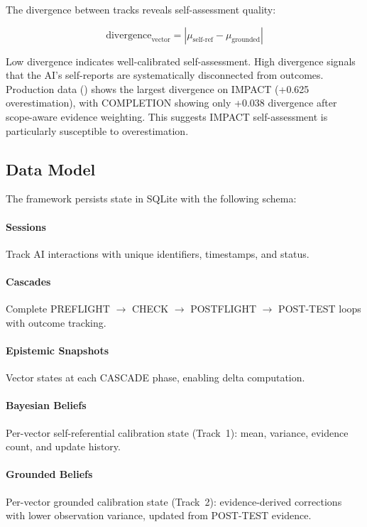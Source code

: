 The divergence between tracks reveals self-assessment quality:

\begin{equation}
\text{divergence}_{\text{vector}} = |\mu_{\text{self-ref}} - \mu_{\text{grounded}}|
\end{equation}

Low divergence indicates well-calibrated self-assessment. High divergence signals that the AI's self-reports are systematically disconnected from outcomes. Production data () shows the largest divergence on IMPACT (+0.625 overestimation), with COMPLETION showing only +0.038 divergence after scope-aware evidence weighting. This suggests IMPACT self-assessment is particularly susceptible to overestimation.

\subsection{Data Model}

The framework persists state in SQLite with the following schema:

\paragraph{Sessions} Track AI interactions with unique identifiers, timestamps, and status.

\paragraph{Cascades} Complete PREFLIGHT $\rightarrow$ CHECK $\rightarrow$ POSTFLIGHT $\rightarrow$ POST-TEST loops with outcome tracking.

\paragraph{Epistemic Snapshots} Vector states at each CASCADE phase, enabling delta computation.

\paragraph{Bayesian Beliefs} Per-vector self-referential calibration state (Track~1): mean, variance, evidence count, and update history.

\paragraph{Grounded Beliefs} Per-vector grounded calibration state (Track~2): evidence-derived corrections with lower observation variance, updated from POST-TEST evidence.

